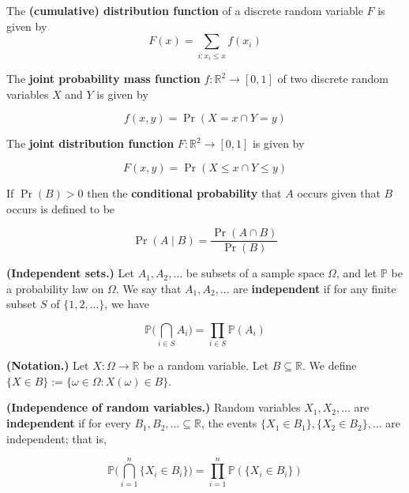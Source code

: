\begin{definition}The \textbf{(cumulative) distribution function} of a discrete random variable \(F\) is given by \[F(x) = \sum_{i:x_i \leq x} f(x_i)\] \end{definition}

\begin{definition}The \textbf{joint probability mass function} \(f: \mathbb{R}^2 \to [0, 1]\) of two discrete random variables \(X\) and \(Y\) is given by

\[
f(x, y) = \Pr(X = x \cap Y = y)
\] \end{definition}

\begin{definition}The \textbf{joint distribution function} \(F: \mathbb{R}^2 \to [0, 1]\) is given by

\[
F(x, y) = \Pr(X \leq x \cap Y \leq y)
\]\end{definition}

\begin{definition}If \(\Pr(B) > 0\) then the \textbf{conditional probability} that \(A\) occurs given that \(B\) occurs is defined to be

\[
\Pr(A \mid B) = \frac{\Pr(A \cap B)}{\Pr(B)}
\]\end{definition}

\begin{definition}\textbf{(Independent sets.)} Let \(A_1, A_2, \ldots\) be subsets of a sample space \(\Omega\), and let \(\mathbb{P}\) be a probability law on \(\Omega\). We say that \(A_1, A_2, \ldots\) are \textbf{independent} if for any finite subset \(S\) of \(\{1, 2, \ldots\}\), we have

\[
\mathbb{P}\bigg( \bigcap_{i \in S} A_i \bigg) = \prod_{i \in S} \mathbb{P}(A_i)
\]

\end{definition}

\begin{definition} \textbf{(Notation.)} Let \(X: \Omega \to \mathbb{R}\) be a random variable. Let \(B \subseteq \mathbb{R}\). We define \(\{X \in B\} := \{\omega \in \Omega: X(\omega) \in B\}\).

\end{definition}

\begin{definition}\textbf{(Independence of random variables.)} Random variables \(X_1, X_2, \ldots\) are \textbf{independent} if for every \(B_1, B_2, \ldots \subseteq \mathbb{R}\), the events \(\{X_1 \in B_1\}, \{X_2 \in B_2\}, \ldots\) are independent; that is, 

\[
\mathbb{P} \bigg( \bigcap_{i=1}^n \{X_i \in B_i\} \bigg) = \prod_{i=1}^n \mathbb{P}(\{X_i \in B_i\})
\]
\end{definition}

